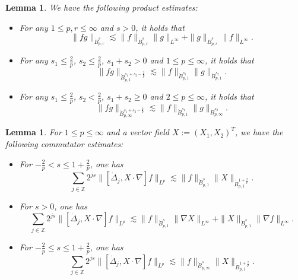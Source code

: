\documentclass[10pt,a4paper]{amsart}
\numberwithin{equation}{section}
\newtheorem{lemma}[theorem]{Lemma}
\begin{document}
\begin{lemma}\label{lem2.3}
 We have the following product estimates:
 \begin{itemize}
\item For any $1\leqslant p,r\leqslant\infty$ and $s>0$, it holds that
 \begin{equation}\label{2.7}
 \|fg\|_{\dot{B}^s_{p,r}}\lesssim\|f\|_{\dot{B}^s_{p,r}}\|g\|_{L^\infty}+\|g\|_{\dot{B}^s_{p,r}}\|f\|_{L^\infty}.
 \end{equation}

\item For any $s_1\leqslant\frac{2}{p}$, $s_2\leqslant\frac{2}{p}$, $s_1+s_2>0$ and
$1\leqslant p\leqslant\infty$, it holds that
\begin{equation} \label{2.8}
 \|fg\|_{\dot{B}^{s_1+s_2-\frac{2}{p}}_{p,1}}\lesssim\|f\|_{\dot{B}^{s_1}_{p,1}}\|g\|_{\dot{B}^{s_2}_{p,1}}.
\end{equation}

\item For any $s_1\leqslant\frac{2}{p}$, $s_2<\frac{2}{p}$, $s_1+s_2\geqslant0$ and $2\leqslant p\leqslant\infty$, it holds that
\begin{equation}\label{2.9}
 \|fg\|_{\dot{B}^{s_1+s_2-\frac{2}{p}}_{p,\infty}}\lesssim\|f\|_{\dot{B}^{s_1}_{p,1}}\|g\|_{\dot{B}^{s_2}_{p,\infty}}.
\end{equation}
 \end{itemize}
\end{lemma}

\begin{lemma}\label{lem2.4}
For $1\leqslant p\leqslant\infty$ and a vector field $X:=(X_1,X_2)^T$, we have the
following commutator estimates:
 \begin{itemize}
\item For $-\frac{2}{p}<s\leqslant1+\frac{2}{p}$, one has
 \begin{equation}\label{2.10}
 \sum_{j\in\mathbb{Z}}2^{js}\|[\dot{\Delta}_j,X\cdot\nabla]f\|_{L^p}\lesssim\|f\|_{\dot{B}^s_{p,1}}\|X\|_{\dot{B}^{1+\frac{2}{p}}_{p,1}}.
 \end{equation}

\item For $s>0$, one has
 \begin{equation}\label{2.11}
 \sum_{j\in\mathbb{Z}}2^{js}\|[\dot{\Delta}_j,X\cdot\nabla]f\|_{L^p}\lesssim\|f\|_{\dot{B}^s_{p,1}}\|\nabla X\|_{L^\infty}+\|X\|_{\dot{B}^{s}_{p,1}}\|\nabla f\|_{L^\infty}.
 \end{equation}

\item For $-\frac{2}{p}\leqslant s\leqslant1+\frac{2}{p}$, one has
 \begin{equation}\label{2.12}
 \sum_{j\in\mathbb{Z}}2^{js}\|[\dot{\Delta}_j,X\cdot\nabla]f\|_{L^p}\lesssim\|f\|_{\dot{B}^s_{p,\infty}}\|X\|_{\dot{B}^{1+\frac{2}{p}}_{p,1}}.
 \end{equation}
\end{itemize}
\end{lemma}
\end{document}
